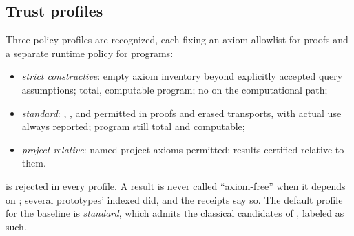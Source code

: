 \subsection{Trust profiles}\label{sec:profiles}

Three policy profiles are recognized, each fixing an axiom allowlist for proofs and a separate runtime policy for programs:
\begin{itemize}
\item \emph{strict constructive}: empty axiom inventory beyond explicitly accepted query assumptions; total, computable program; no  on the computational path;
\item \emph{standard}: , , and  permitted in proofs and erased transports, with actual use always reported; program still total and computable;
\item \emph{project-relative}: named project axioms permitted; results certified relative to them.
\end{itemize}
 is rejected in every profile. A result is never called ``axiom-free'' when it depends on ; several prototypes' indexed  did, and the receipts say so. The default profile for the baseline is \emph{standard}, which admits the classical candidates of , labeled as such.
